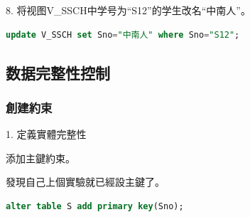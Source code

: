 \documentclass[12pt, a4paper]{report}
\begin{document}
8. 将视图V\_SSCH中学号为“S12”的学生改名“中南人”。\\

\begin{lstlisting}[language=SQL]
    update V_SSCH set Sno="中南人" where Sno="S12";
\end{lstlisting}

\begin{figure}[H] %
    \centering %
\end{figure}

\subsection{数据完整性控制}

\subsubsection{創建約束}

1. 定義實體完整性

添加主鍵約束。

發現自己上個實驗就已經設主鍵了。\\

\begin{lstlisting}[language=SQL]
    alter table S add primary key(Sno);
\end{lstlisting}

\begin{figure}[H] %
    \centering %
\end{figure}
\end{document}
